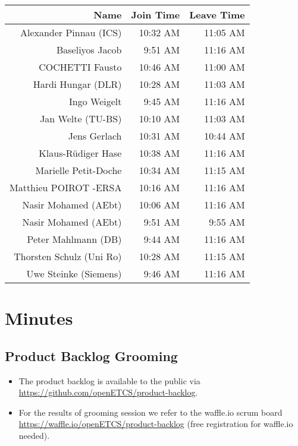 \documentclass[a4paper, 11pt]{article}
\begin{document}
\begin{table}[htbp]
    \begin{tabular}{rrr}
    \toprule
    \textbf{Name} & \textbf{Join Time} & \textbf{Leave Time} \\
    \midrule
    Alexander Pinnau (ICS) & 10:32 AM & 11:05 AM \\
    Baseliyos Jacob & 9:51 AM & 11:16 AM \\
    COCHETTI Fausto & 10:46 AM & 11:00 AM \\
    Hardi Hungar (DLR) & 10:28 AM & 11:03 AM \\
    Ingo Weigelt & 9:45 AM & 11:16 AM \\
    Jan Welte (TU-BS) & 10:10 AM & 11:03 AM \\
    Jens Gerlach & 10:31 AM & 10:44 AM \\
    Klaus-R\"udiger Hase & 10:38 AM & 11:16 AM \\
    Marielle Petit-Doche & 10:34 AM & 11:15 AM \\
    Matthieu POIROT -ERSA & 10:16 AM & 11:16 AM \\
    Nasir Mohamed (AEbt) & 10:06 AM & 11:16 AM \\
    Nasir Mohamed (AEbt) & 9:51 AM & 9:55 AM \\
    Peter Mahlmann (DB) & 9:44 AM & 11:16 AM \\
    Thorsten Schulz (Uni Ro) & 10:28 AM & 11:15 AM \\
    Uwe Steinke (Siemens) & 9:46 AM & 11:16 AM \\
    \bottomrule
    \end{tabular}%
  \label{tab:addlabel}%
\end{table}%



\section{Minutes}

\subsection{Product Backlog Grooming}
\begin{itemize}
\item The product backlog is available to the public via 
\url{https://github.com/openETCS/product-backlog}. 
\item For the results of grooming session we refer to the waffle.io scrum board \url{https://waffle.io/openETCS/product-backlog} (free registration for waffle.io needed).
\end{itemize}
\end{document}
